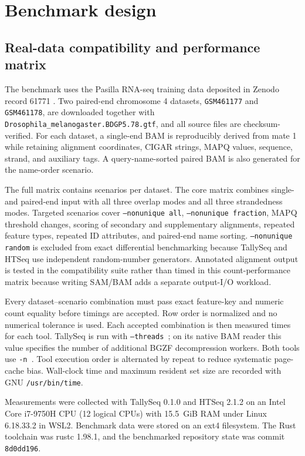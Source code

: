 \documentclass[11pt]{article}
\begin{document}
\section{Benchmark design}

\subsection{Real-data compatibility and performance matrix}

The benchmark uses the Pasilla RNA-seq training data deposited in Zenodo record 61771 \citep{Gruning2016}. Two paired-end chromosome 4 datasets, \texttt{GSM461177} and \texttt{GSM461178}, are downloaded together with \texttt{Drosophila\_melanogaster.BDGP5.78.gtf}, and all source files are checksum-verified. For each dataset, a single-end BAM is reproducibly derived from mate 1 while retaining alignment coordinates, CIGAR strings, MAPQ values, sequence, strand, and auxiliary tags. A query-name-sorted paired BAM is also generated for the name-order scenario.

The full matrix contains \BenchmarkScenarioCount{} scenarios per dataset. The core matrix combines single- and paired-end input with all three overlap modes and all three strandedness modes. Targeted scenarios cover \texttt{--nonunique all}, \texttt{--nonunique fraction}, MAPQ threshold changes, scoring of secondary and supplementary alignments, repeated feature types, repeated ID attributes, and paired-end name sorting. \texttt{--nonunique random} is excluded from exact differential benchmarking because TallySeq and HTSeq use independent random-number generators. Annotated alignment output is tested in the compatibility suite rather than timed in this count-performance matrix because writing SAM/BAM adds a separate output-I/O workload.

Every dataset--scenario combination must pass exact feature-key and numeric count equality before timings are accepted. Row order is normalized and no numerical tolerance is used. Each accepted combination is then measured \BenchmarkRepeats{} times for each tool. TallySeq is run with \texttt{--threads \BenchmarkTallyThreads}; on its native BAM reader this value specifies the number of additional BGZF decompression workers. Both tools use \texttt{-n \BenchmarkNProcesses}. Tool execution order is alternated by repeat to reduce systematic page-cache bias. Wall-clock time and maximum resident set size are recorded with GNU \texttt{/usr/bin/time}.

Measurements were collected with TallySeq 0.1.0 and HTSeq 2.1.2 on an Intel Core i7-9750H CPU (12 logical CPUs) with 15.5~GiB RAM under Linux 6.18.33.2 in WSL2. Benchmark data were stored on an ext4 filesystem. The Rust toolchain was rustc 1.98.1, and the benchmarked repository state was commit \texttt{8d0dd196}.
\end{document}
